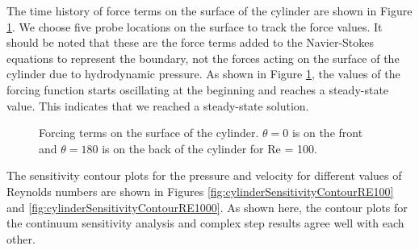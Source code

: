 \documentclass[12pt]{aiaa-pretty}
\begin{document}
The time history of force terms on the surface of the cylinder are shown in Figure \ref{fig:cylinderForceTerms}. We choose five probe locations on the surface to track the force values. It should be noted that these are the force terms added to the Navier-Stokes equations to represent the boundary, not the forces acting on the surface of the cylinder due to hydrodynamic pressure. As shown in Figure \ref{fig:cylinderForceTerms}, the values of the forcing function starts oscillating at the beginning and reaches a steady-state value. This indicates that we reached a steady-state solution.

%
\begin{figure}[H]
	\centering
	\quad
	\caption{Forcing terms on the surface of the cylinder. $\theta = 0$ is on the front and $\theta = 180$ is on the back of the cylinder for Re = 100.}
	\label{fig:cylinderForceTerms}
\end{figure}
%

The sensitivity contour plots for the pressure and velocity for different values of Reynolds numbers are shown in Figures \ref{fig:cylinderSensitivityContourRE100} and \ref{fig:cylinderSensitivityContourRE1000}. As shown here, the contour plots for the continuum sensitivity analysis and complex step results agree well with each other.
\end{document}
